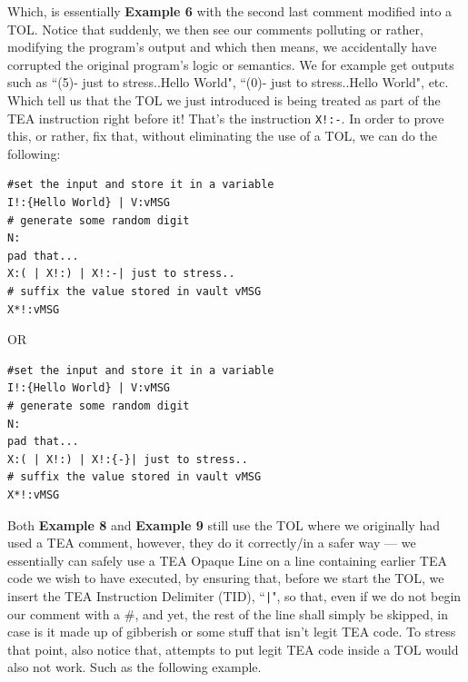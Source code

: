 \documentclass[a4paper, 18pt]{book} %
\begin{document}
{{{\begin{appendices}
\vspace{2em}


Which, is essentially \textbf{Example 6} with the second last comment modified into a TOL. Notice that suddenly, we then see our comments polluting or rather, modifying the program's output and which then means, we accidentally have corrupted the original program's logic or semantics. We for example get outputs such as ``(5)- just to stress..Hello World", ``(0)- just to stress..Hello World", etc. Which tell us that the TOL we just introduced is being treated as part of the TEA instruction right before it! That's the instruction \texttt{X!:-}. In order to prove this, or rather, fix that, without eliminating the use of a TOL, we can do the following:


\vspace{2em}

  \begin{tcolorbox}[teaterminalstyle, title=TEA COMMENTS: Example 8: Program with comments and TOL, breakable]
  \begin{lstlisting}[language=TEA,breaklines=true,]
#set the input and store it in a variable
I!:{Hello World} | V:vMSG
# generate some random digit
N:
pad that... 
X:( | X!:) | X!:-| just to stress..
# suffix the value stored in vault vMSG
X*!:vMSG
   \end{lstlisting}
  \end{tcolorbox}

\vspace{2em}

OR


\vspace{2em}

  \begin{tcolorbox}[teaterminalstyle, title=TEA COMMENTS: Example 9: Program with comments and TOL, breakable]
  \begin{lstlisting}[language=TEA,breaklines=true,]
#set the input and store it in a variable
I!:{Hello World} | V:vMSG
# generate some random digit
N:
pad that... 
X:( | X!:) | X!:{-}| just to stress..
# suffix the value stored in vault vMSG
X*!:vMSG
   \end{lstlisting}
  \end{tcolorbox}

\vspace{2em}


Both \textbf{Example 8} and \textbf{Example 9} still use the TOL where we originally had used a TEA comment, however, they do it correctly/in a safer way --- we essentially can safely use a TEA Opaque Line on a line containing earlier TEA code we wish to have executed, by ensuring that, before we start the TOL, we insert the TEA Instruction Delimiter (TID), ``\verb$|$", so that, even if we do not begin our comment with a \#, and yet, the rest of the line shall simply be skipped, in case is it made up of gibberish or some stuff that isn't legit TEA code. To stress that point, also notice that, attempts to put legit TEA code inside a TOL would also not work. Such as the following example.




\end{appendices}}}}
\end{document}
